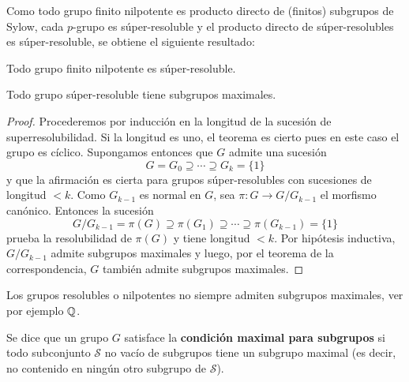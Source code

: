 Como todo grupo finito nilpotente es producto directo de (finitos) subgrupos de
Sylow, cada $p$-grupo es súper-resoluble y el producto directo de súper-resolubles es súper-resoluble, 
se obtiene el siguiente resultado:

\begin{proposition}
	Todo grupo finito nilpotente es súper-resoluble.
\end{proposition}


\begin{theorem}
	Todo grupo súper-resoluble tiene subgrupos maximales.	
\end{theorem}

\begin{proof}
	Procederemos por inducción en la longitud de la sucesión de
	superresolubilidad. Si la longitud es uno, el teorema es cierto pues en
	este caso el grupo es cíclico. Supongamos entonces que $G$ admite una
	sucesión
	\[
		G=G_0\supseteq\cdots\supseteq G_k=\{1\}
	\]
	y que la afirmación es cierta para grupos súper-resolubles con sucesiones 
	de longitud $<k$. Como $G_{k-1}$ es normal en $G$, sea $\pi\colon G\to
	G/G_{k-1}$ el morfismo canónico. Entonces la sucesión
	\[
		G/G_{k-1}=\pi(G)\supseteq \pi(G_1)\supseteq\cdots\supseteq\pi(G_{k-1})=\{1\}
	\]
	prueba la resolubilidad de $\pi(G)$ y tiene longitud $<k$. Por hipótesis
	inductiva, $G/G_{k-1}$ admite subgrupos maximales y luego, por el teorema
	de la correspondencia, $G$ también admite subgrupos maximales.
\end{proof}

Los grupos resolubles o nilpotentes no siempre admiten
subgrupos maximales, ver por ejemplo $\mathbb{Q}$.

\begin{definition}
	Se dice que un grupo $G$ satisface la \textbf{condición maximal para
	subgrupos} si 
	todo subconjunto $\mathcal{S}$ no vacío de subgrupos tiene un subgrupo
	maximal (es decir, no contenido en ningún otro subgrupo de $\mathcal{S}$). 
\end{definition}


